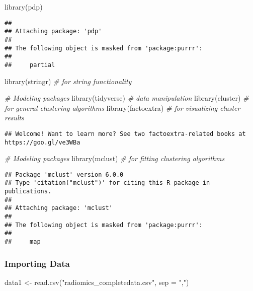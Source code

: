 \documentclass[
]{article}
\newenvironment{Shaded}{\begin{snugshade}}{\end{snugshade}}
\newcommand{\AttributeTok}[1]{\textcolor[rgb]{0.77,0.63,0.00}{#1}}
\newcommand{\CommentTok}[1]{\textcolor[rgb]{0.56,0.35,0.01}{\textit{#1}}}
\newcommand{\FunctionTok}[1]{\textcolor[rgb]{0.00,0.00,0.00}{#1}}
\newcommand{\NormalTok}[1]{#1}
\newcommand{\OtherTok}[1]{\textcolor[rgb]{0.56,0.35,0.01}{#1}}
\newcommand{\StringTok}[1]{\textcolor[rgb]{0.31,0.60,0.02}{#1}}
\begin{document}
\begin{Shaded}
\begin{Highlighting}[]
\FunctionTok{library}\NormalTok{(pdp) }
\end{Highlighting}
\end{Shaded}

\begin{verbatim}
## 
## Attaching package: 'pdp'
## 
## The following object is masked from 'package:purrr':
## 
##     partial
\end{verbatim}

\begin{Shaded}
\begin{Highlighting}[]
\FunctionTok{library}\NormalTok{(stringr)     }\CommentTok{\# for string functionality}

\CommentTok{\# Modeling packages}
\FunctionTok{library}\NormalTok{(tidyverse)  }\CommentTok{\# data manipulation}
\FunctionTok{library}\NormalTok{(cluster)     }\CommentTok{\# for general clustering algorithms}
\FunctionTok{library}\NormalTok{(factoextra)  }\CommentTok{\# for visualizing cluster results}
\end{Highlighting}
\end{Shaded}

\begin{verbatim}
## Welcome! Want to learn more? See two factoextra-related books at https://goo.gl/ve3WBa
\end{verbatim}

\begin{Shaded}
\begin{Highlighting}[]
\CommentTok{\# Modeling packages}
\FunctionTok{library}\NormalTok{(mclust)   }\CommentTok{\# for fitting clustering algorithms}
\end{Highlighting}
\end{Shaded}

\begin{verbatim}
## Package 'mclust' version 6.0.0
## Type 'citation("mclust")' for citing this R package in publications.
## 
## Attaching package: 'mclust'
## 
## The following object is masked from 'package:purrr':
## 
##     map
\end{verbatim}

\hypertarget{importing-data}{%
\subsubsection{Importing Data}\label{importing-data}}

\begin{Shaded}
\begin{Highlighting}[]
\NormalTok{data1 }\OtherTok{\textless{}{-}} \FunctionTok{read.csv}\NormalTok{(}\StringTok{"radiomics\_completedata.csv"}\NormalTok{, }\AttributeTok{sep =} \StringTok{","}\NormalTok{)}
\end{Highlighting}
\end{Shaded}
\end{document}
